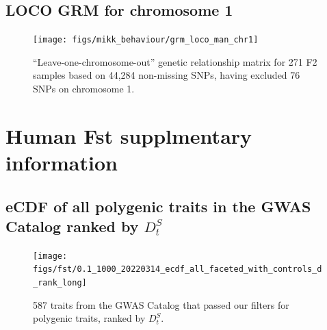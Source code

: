 \documentclass[
]{book}
\begin{document}
\hypertarget{loco-grm-for-chromosome-1}{%
\section{LOCO GRM for chromosome 1}\label{loco-grm-for-chromosome-1}}



\begin{figure}
\texttt{[image: figs/mikk\_behaviour/grm\_loco\_man\_chr1]} \caption{``Leave-one-chromosome-out'' genetic relationship matrix for 271 F2 samples based on 44,284 non-missing SNPs, having excluded 76 SNPs on chromosome 1.}\label{fig:loco-grm-chr1}
\end{figure}

\hypertarget{human-fst-supplmentary-information}{%
\chapter{Human Fst supplmentary information}\label{human-fst-supplmentary-information}}

\hypertarget{ecdf-of-all-polygenic-traits-in-the-gwas-catalog-ranked-by-d_ts}{%
\section{\texorpdfstring{eCDF of all polygenic traits in the GWAS Catalog ranked by \({D_t^S}\)}{eCDF of all polygenic traits in the GWAS Catalog ranked by \{D\_t\^{}S\}}}\label{ecdf-of-all-polygenic-traits-in-the-gwas-catalog-ranked-by-d_ts}}



\begin{figure}
\texttt{[image: figs/fst/0.1\_1000\_20220314\_ecdf\_all\_faceted\_with\_controls\_d\_rank\_long]} \caption{587 traits from the GWAS Catalog that passed our filters for polygenic traits, ranked by \({D_t^S}\).}\label{fig:eCDFall}
\end{figure}
\end{document}
